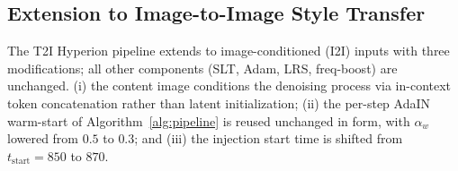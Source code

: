 \subsection{Extension to Image-to-Image Style Transfer}
\label{sec:method:i2i}

The T2I Hyperion pipeline extends to image-conditioned (I2I) inputs with
three modifications; all other components (SLT, Adam, LRS, freq-boost)
are unchanged. (i) the content image conditions the denoising process
via in-context token concatenation rather than latent initialization; (ii)
the per-step AdaIN warm-start of Algorithm~\ref{alg:pipeline} is reused
unchanged in form, with $\alpha_w$ lowered from $0.5$ to $0.3$; and (iii) the
injection start time is shifted from $t_\text{start}=850$ to $870$.

